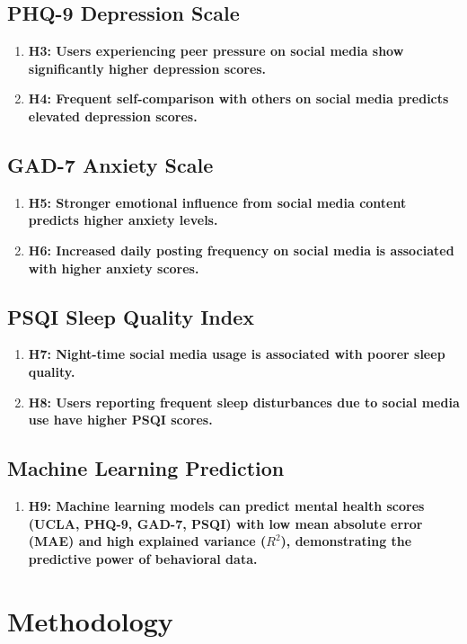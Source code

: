 \documentclass[twocolumn,numbers]{article}
\begin{document}
\subsection*{PHQ-9 Depression Scale}
\begin{enumerate}
    \item \textbf{H3: Users experiencing peer pressure on social media show significantly higher depression scores.}
    \item \textbf{H4: Frequent self-comparison with others on social media predicts elevated depression scores.}
\end{enumerate}

\subsection*{GAD-7 Anxiety Scale}
\begin{enumerate}
    \item \textbf{H5: Stronger emotional influence from social media content predicts higher anxiety levels.}
    \item \textbf{H6: Increased daily posting frequency on social media is associated with higher anxiety scores.}
\end{enumerate}

\subsection*{PSQI Sleep Quality Index}
\begin{enumerate}
    \item \textbf{H7: Night-time social media usage is associated with poorer sleep quality.}
    \item \textbf{H8: Users reporting frequent sleep disturbances due to social media use have higher PSQI scores.}
\end{enumerate}

\subsection*{Machine Learning Prediction}
\begin{enumerate}
    \item \textbf{H9: Machine learning models can predict mental health scores (UCLA, PHQ-9, GAD-7, PSQI) with low mean absolute error (MAE) and high explained variance ($R^2$), demonstrating the predictive power of behavioral data.}
\end{enumerate}


\section{Methodology}
\end{document}
